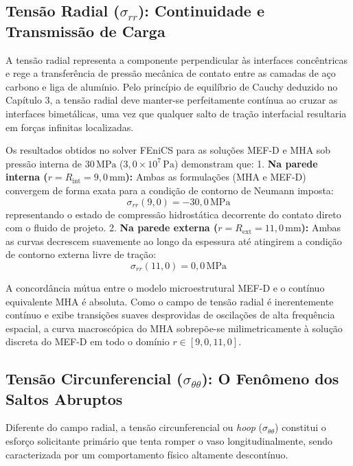 \subsection{Tensão Radial ($\sigma_{rr}$): Continuidade e Transmissão de Carga}

A tensão radial representa a componente perpendicular às interfaces concêntricas e rege a transferência de pressão mecânica de contato entre as camadas de aço carbono e liga de alumínio. Pelo princípio de equilíbrio de Cauchy deduzido no Capítulo 3, a tensão radial deve manter-se perfeitamente contínua ao cruzar as interfaces bimetálicas, uma vez que qualquer salto de tração interfacial resultaria em forças infinitas localizadas.

Os resultados obtidos no solver FEniCS para as soluções MEF-D e MHA sob pressão interna de $30 \, \text{MPa}$ ($3,0 \times 10^7 \, \text{Pa}$) demonstram que:
1. \textbf{Na parede interna ($r = R_{\text{int}} = 9,0 \, \text{mm}$):} Ambas as formulações (MHA e MEF-D) convergem de forma exata para a condição de contorno de Neumann imposta:
\begin{equation}
  \sigma_{rr}(9,0) = -30,0 \, \text{MPa}
  \label{eq:srr_int_val}
\end{equation}
representando o estado de compressão hidrostática decorrente do contato direto com o fluido de projeto.
2. \textbf{Na parede externa ($r = R_{\text{ext}} = 11,0 \, \text{mm}$):} Ambas as curvas decrescem suavemente ao longo da espessura até atingirem a condição de contorno externa livre de tração:
\begin{equation}
  \sigma_{rr}(11,0) = 0,0 \, \text{MPa}
  \label{eq:srr_ext_val}
\end{equation}

A concordância mútua entre o modelo microestrutural MEF-D e o contínuo equivalente MHA é absoluta. Como o campo de tensão radial é inerentemente contínuo e exibe transições suaves desprovidas de oscilações de alta frequência espacial, a curva macroscópica do MHA sobrepõe-se milimetricamente à solução discreta do MEF-D em todo o domínio $r \in [9,0, 11,0]$.

\subsection{Tensão Circunferencial ($\sigma_{\theta\theta}$): O Fenômeno dos Saltos Abruptos}

Diferente do campo radial, a tensão circunferencial ou \textit{hoop} ($\sigma_{\theta\theta}$) constitui o esforço solicitante primário que tenta romper o vaso longitudinalmente, sendo caracterizada por um comportamento físico altamente descontínuo.

